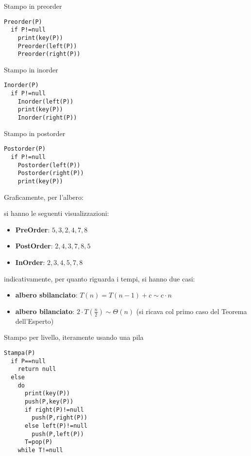 \documentclass[a4paper,12pt,oneside,tikz]{book}
\begin{document}
\newpage
\begin{esempio}[preorder]
Stampo in preorder
\begin{verbatim}
Preorder(P)
  if P!=null 
    print(key(P))
    Preorder(left(P))
    Preorder(right(P))
\end{verbatim}
\end{esempio}
\begin{esempio}[Inorder]
Stampo in inorder
\begin{verbatim}
Inorder(P)
  if P!=null 
    Inorder(left(P))
    print(key(P))
    Inorder(right(P))
\end{verbatim}
\end{esempio}
\begin{esempio}[postorder]
Stampo in postorder
\begin{verbatim}
Postorder(P)
  if P!=null 
    Postorder(left(P))
    Postorder(right(P))
    print(key(P))
\end{verbatim}
\end{esempio}
Graficamente, per l'albero:
\begin{center}
\end{center}
si hanno le seguenti visualizzazioni:
\begin{itemize}
\item \textbf{PreOrder}: $5,3,2,4,7,8$
\item \textbf{PostOrder}: $2,4,3,7,8,5$
\item \textbf{InOrder}: $2,3,4,5,7,8$
\end{itemize}
indicativamente, per quanto riguarda i tempi, si hanno due casi:
\begin{itemize}
\item \textbf{albero sbilanciato}: $T(n)=T(n-1)+c\sim c\cdot n$
\item \textbf{albero bilanciato}: $2\cdot T\left(\frac{n}{2}\right)\sim \Theta(n)$ (si ricava col primo caso del Teorema dell'Esperto)
\end{itemize}
\begin{esempio}
Stampo per livello, iteramente usando una pila
\begin{verbatim}
Stampa(P)
  if P==null
    return null
  else
    do
      print(key(P))
      push(P,key(P))
      if right(P)!=null
        push(P,right(P))
      else left(P)!=null
        push(P,left(P))
      T=pop(P)
    while T!=null
  
\end{verbatim}
\end{esempio}
\end{document}
